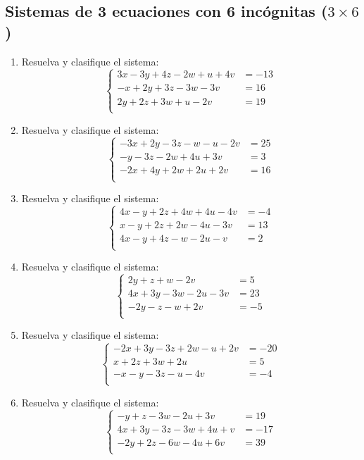 \documentclass[11pt]{article}
\begin{document}
\subsection{Sistemas de 3 ecuaciones con 6 incógnitas ($ 3\times 6 $)}
\begin{enumerate}
\item Resuelva y clasifique el sistema:
\[
\left\{\begin{aligned}
3x-3y+4z-2w+u+4v&=-13\\
-x+2y+3z-3w-3v&=16\\
2y+2z+3w+u-2v&=19\\
\end{aligned}\right.
\]
\item Resuelva y clasifique el sistema:
\[
\left\{\begin{aligned}
-3x+2y-3z-w-u-2v&=25\\
-y-3z-2w+4u+3v&=3\\
-2x+4y+2w+2u+2v&=16\\
\end{aligned}\right.
\]
\item Resuelva y clasifique el sistema:
\[
\left\{\begin{aligned}
4x-y+2z+4w+4u-4v&=-4\\
x-y+2z+2w-4u-3v&=13\\
4x-y+4z-w-2u-v&=2\\
\end{aligned}\right.
\]
\item Resuelva y clasifique el sistema:
\[
\left\{\begin{aligned}
2y+z+w-2v&=5\\
4x+3y-3w-2u-3v&=23\\
-2y-z-w+2v&=-5\\
\end{aligned}\right.
\]
\item Resuelva y clasifique el sistema:
\[
\left\{\begin{aligned}
-2x+3y-3z+2w-u+2v&=-20\\
x+2z+3w+2u&=5\\
-x-y-3z-u-4v&=-4\\
\end{aligned}\right.
\]
\item Resuelva y clasifique el sistema:
\[
\left\{\begin{aligned}
-y+z-3w-2u+3v&=19\\
4x+3y-3z-3w+4u+v&=-17\\
-2y+2z-6w-4u+6v&=39\\
\end{aligned}\right.
\]
\end{enumerate}
\end{document}
